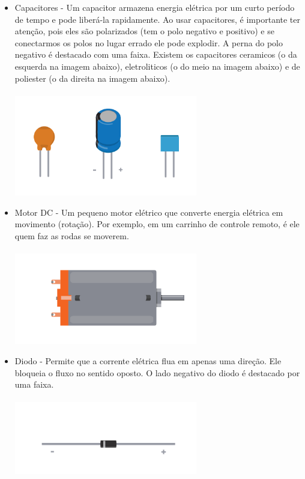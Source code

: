 \documentclass{report}
\begin{document}
\begin{itemize}
		\item Capacitores - Um capacitor armazena energia elétrica por um curto período de tempo e pode liberá-la rapidamente. Ao usar capacitores, é importante ter atenção, pois eles são polarizados (tem o polo negativo e positivo) e se conectarmos os polos no lugar errado ele pode explodir. A perna do polo negativo é destacado com uma faixa. Existem os capacitores ceramicos (o da esquerda na imagem abaixo), eletroliticos (o do meio na imagem abaixo) e de poliester (o da direita na imagem abaixo).  \\ \\
		\includegraphics[width=8cm]{imagens/capacitores.png}
		
		\item Motor DC - Um pequeno motor elétrico que converte energia elétrica em movimento (rotação). Por exemplo, em um carrinho de controle remoto, é ele quem faz as rodas se moverem. \\ \\
		\includegraphics[width=8cm]{imagens/motor_dc.png}
		
		\item Diodo - Permite que a corrente elétrica flua em apenas uma direção. Ele bloqueia o fluxo no sentido oposto. O lado negativo do diodo é destacado por uma faixa.\\ \\
		\includegraphics[width=8cm]{imagens/diodo.png}
		

\end{itemize}
\end{document}
